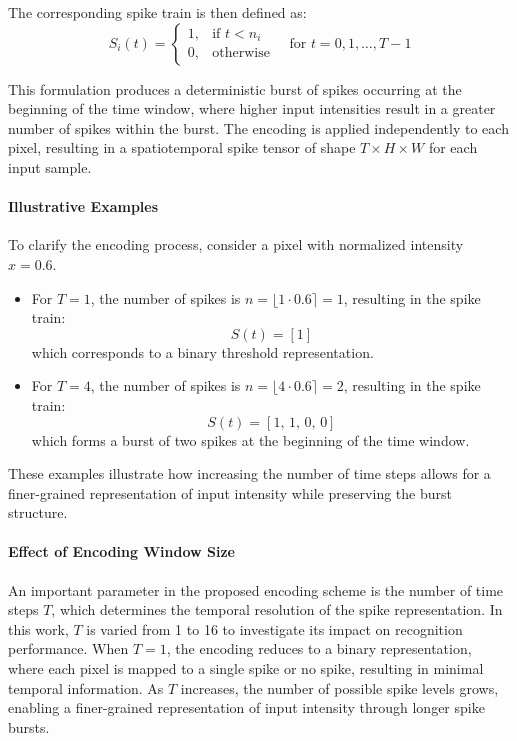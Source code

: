 \documentclass[../main.tex]{subfiles}
\begin{document}
The corresponding spike train is then defined as:
\[
S_i(t) =
\begin{cases}
1, & \text{if } t < n_i \\
0, & \text{otherwise}
\end{cases}
\quad \text{for } t = 0, 1, \dots, T-1
\]

This formulation produces a deterministic burst of spikes occurring at the beginning of the time window, where higher input intensities result in a greater number of spikes within the burst. The encoding is applied independently to each pixel, resulting in a spatiotemporal spike tensor of shape $T \times H \times W$ for each input sample.

\paragraph{Illustrative Examples}

To clarify the encoding process, consider a pixel with normalized intensity $x = 0.6$.

\begin{itemize}
    \item For $T = 1$, the number of spikes is $n = \lfloor 1 \cdot 0.6 \rceil = 1$, resulting in the spike train:
    \[
    S(t) = [1]
    \]
    which corresponds to a binary threshold representation.

    \item For $T = 4$, the number of spikes is $n = \lfloor 4 \cdot 0.6 \rceil = 2$, resulting in the spike train:
    \[
    S(t) = [1,\,1,\,0,\,0]
    \]
    which forms a burst of two spikes at the beginning of the time window.
\end{itemize}

These examples illustrate how increasing the number of time steps allows for a finer-grained representation of input intensity while preserving the burst structure.

\paragraph{Effect of Encoding Window Size}
An important parameter in the proposed encoding scheme is the number of time steps $T$, which determines the temporal resolution of the spike representation. In this work, $T$ is varied from 1 to 16 to investigate its impact on recognition performance. When $T = 1$, the encoding reduces to a binary representation, where each pixel is mapped to a single spike or no spike, resulting in minimal temporal information. As $T$ increases, the number of possible spike levels grows, enabling a finer-grained representation of input intensity through longer spike bursts.
\end{document}
